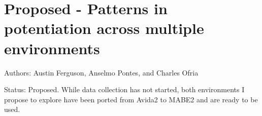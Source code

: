 \chapter{Proposed -  Patterns in potentiation across multiple environments}
\label{chap:varying_environments}

\noindent
Authors: Austin Ferguson, Anselmo Pontes, and Charles Ofria

\noindent
Status: Proposed. %
While data collection has not started, both environments I propose to explore have been ported from Avida2 to MABE2 and are ready to be used. 
 





